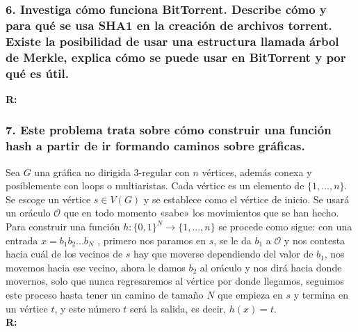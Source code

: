 \documentclass[14pt]{article}
\begin{document}
\subsubsection*{6. Investiga cómo funciona BitTorrent. Describe cómo y para qué se usa SHA1 en la creación de archivos torrent. Existe la posibilidad de usar una estructura llamada árbol de Merkle, explica cómo se puede usar en BitTorrent y por qué es útil.}
\textbf{R:} 
\subsubsection*{7. Este problema trata sobre cómo construir una función hash a partir de ir formando caminos sobre gráficas.}
  Sea $G$ una gráfica no dirigida 3-regular con $n$ vértices, además conexa y posiblemente con loops o multiaristas. Cada vértice es un elemento de $\{1, ... , n\}$. Se escoge un vértice $s \in V (G)$ y se establece como el vértice de inicio. Se usará un oráculo $\mathcal{O}$ que en todo momento «sabe» los movimientos que se han hecho. Para construir una función $h : \{0, 1\}^N \rightarrow \{1, ... , n\}$ se procede como sigue: con una entrada $x = b_1 b_2 ... b_N$ , primero nos paramos en $s$, se le da $b_1$ a $\mathcal{O}$ y nos contesta hacia cuál de los vecinos de $s$ hay que moverse dependiendo del valor de $b_1$, nos movemos hacia ese vecino, ahora le damos $b_2$ al oráculo y nos dirá hacia donde movernos, solo que nunca regresaremos al vértice por donde llegamos, seguimos este proceso hasta tener un camino de tamaño $N$ que empieza en $s$ y termina en un vértice $t$, y este número $t$ será la salida, es decir, $h(x) = t$. \\
\textbf{R:} 
\end{document}
